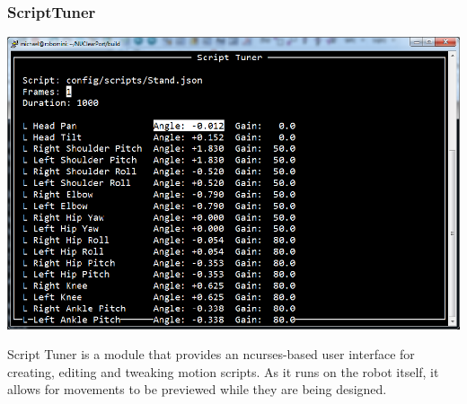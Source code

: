 \documentclass[english,12pt]{scrartcl}
\begin{document}
			\subsubsection{ScriptTuner}
				\includegraphics[width=1\textwidth]{./Images/tuner}

				Script Tuner is a module that provides an ncurses-based user interface for
				creating, editing and tweaking motion scripts. As it runs on the robot itself,
				it allows for movements to be previewed while they are being designed.
\end{document}
